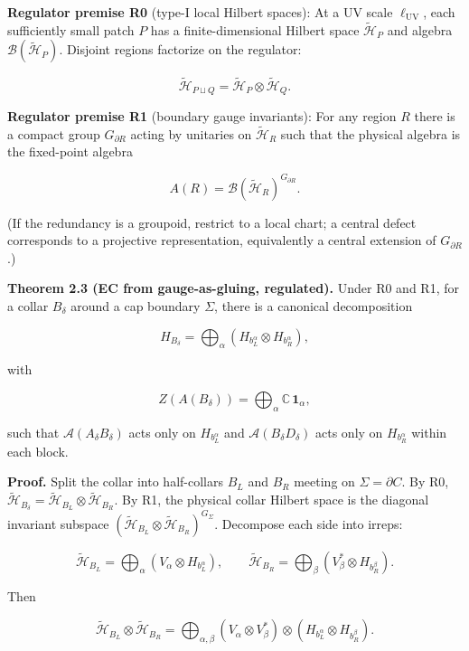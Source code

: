 \textbf{Regulator premise R0} (type-I local Hilbert spaces): At a UV scale \(\ell_{\mathrm{UV}}\), each sufficiently small patch \(P\) has a finite-dimensional Hilbert space \(\tilde{\mathcal H}_P\) and algebra \(\mathcal B(\tilde{\mathcal H}_P)\). Disjoint regions factorize on the regulator:

\[
\tilde{\mathcal H}_{P \sqcup Q} = \tilde{\mathcal H}_P \otimes \tilde{\mathcal H}_Q.
\]

\textbf{Regulator premise R1} (boundary gauge invariants): For any region \(R\) there is a compact group \(G_{\partial R}\) acting by unitaries on \(\tilde{\mathcal H}_R\) such that the physical algebra is the fixed-point algebra

\[
A(R) = \mathcal B(\tilde{\mathcal H}_R)^{G_{\partial R}}.
\]

(If the redundancy is a groupoid, restrict to a local chart; a central defect corresponds to a projective representation, equivalently a central extension of \(G_{\partial R}\).)

\textbf{Theorem 2.3 (EC from gauge-as-gluing, regulated).} Under R0 and R1, for a collar \(B_\delta\) around a cap boundary \(\Sigma\), there is a canonical decomposition

\[
H_{B_\delta} = \bigoplus_{\alpha}
(H_{b_L^{\alpha}} \otimes H_{b_R^{\alpha}}),
\]

with

\[
Z(A(B_\delta)) = \bigoplus_\alpha \mathbb C\,\mathbf 1_\alpha,
\]

such that \(\mathcal{A}(A_\delta B_\delta)\) acts only on \(H_{b_L^\alpha}\) and \(\mathcal{A}(B_\delta D_\delta)\) acts only on \(H_{b_R^\alpha}\) within each block.

\textbf{Proof.} Split the collar into half-collars \(B_L\) and \(B_R\) meeting on \(\Sigma = \partial C\). By R0, \(\tilde{\mathcal H}_{B_\delta} =
\tilde{\mathcal H}_{B_L} \otimes \tilde{\mathcal H}_{B_R}\). By R1, the physical collar Hilbert space is the diagonal invariant subspace \((\tilde{\mathcal H}_{B_L} \otimes \tilde{\mathcal H}_{B_R})^{G_\Sigma}\). Decompose each side into irreps:

\[
\tilde{\mathcal H}_{B_L} = \bigoplus_\alpha (V_\alpha \otimes H_{b_L^\alpha}),\qquad
\tilde{\mathcal H}_{B_R} = \bigoplus_\beta (V_\beta^* \otimes H_{b_R^\beta}).
\]

Then

\[
\tilde{\mathcal H}_{B_L} \otimes \tilde{\mathcal H}_{B_R}
= \bigoplus_{\alpha,\beta}
(V_\alpha \otimes V_\beta^*) \otimes
(H_{b_L^\alpha} \otimes H_{b_R^\beta}).
\]

